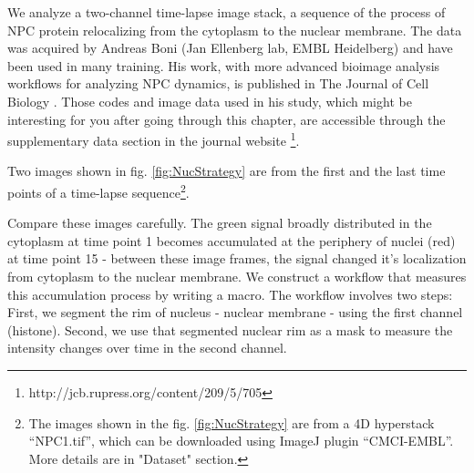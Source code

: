  We analyze a two-channel time-lapse image stack, a sequence of the process of NPC protein relocalizing from the cytoplasm to the nuclear membrane.  The data was acquired by Andreas Boni (Jan Ellenberg lab, EMBL Heidelberg) and have been used in many training. His work, with more advanced bioimage analysis workflows for analyzing NPC dynamics, is published in The Journal of Cell Biology \citep{Boni2015}. Those codes and image data used in his study, which might be interesting for you after going through this chapter, are accessible through the supplementary data section in the journal website \footnote{http://jcb.rupress.org/content/209/5/705}. 
 
 Two images shown in fig. \ref{fig:NucStrategy} are from the first and the last time points of a time-lapse sequence\footnote{The images shown in the fig. \ref{fig:NucStrategy} are from a 4D hyperstack ``NPC1.tif'', which can be downloaded using ImageJ plugin ``CMCI-EMBL''. More details are in "Dataset" section.}. 

Compare these images carefully. The green signal broadly distributed in the cytoplasm at time point 1 becomes accumulated at the periphery of nuclei (red) at time point 15 - between these image frames, the signal changed it's localization from cytoplasm to the nuclear membrane. We construct a workflow that measures this accumulation process by writing a macro. The workflow involves two steps: First, we segment the rim of nucleus - nuclear membrane - using the first channel (histone). Second, we use that segmented nuclear rim as a mask to measure the intensity changes over time in the second channel. 


